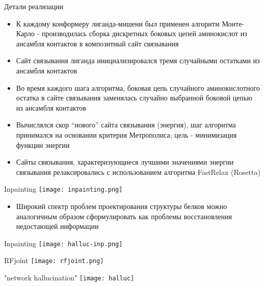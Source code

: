 \begin{frame}{Детали реализации}
    \begin{itemize}
        \item К каждому конформеру лиганда-мишени был применен алгоритм Монте-Карло - производилась
        сборка дискретных боковых цепей аминокислот из ансамбля контактов в композитный сайт
        связывания
        \item       
        Сайт связывания лиганда инициализировался тремя случайными остатками из ансамбля
        контактов
        \item
        Во время каждого шага алгоритма, боковая цепь случайного аминокислотного остатка в сайте
        связывания заменялась случайно выбранной боковой цепью из ансамбля контактов
        \item
        Вычислялся скор “нового” сайта связывания (энергия), шаг алгоритма принимался на основании
        критерия Метрополиса; цель - минимизация функции энергии
        \item
        Сайты связывания, характеризующиеся лучшими значениями энергии связывания
        релаксировались с использованием алгоритма FastRelax (Rosetta)
    \end{itemize}
   
\end{frame}

\begin{frame}{Inpainting}
    \centering
    \texttt{[image: inpainting.png]}
    \begin{itemize}
        \item Широкий спектр проблем проектирования структуры белков можно аналогичным образом сформулировать как проблемы восстановления недостающей информации 
        \end{itemize}

\end{frame}


\begin{frame}{Inpainting}
    \centering
    \texttt{[image: halluc-inp.png]}

\end{frame}

\begin{frame}{RFjoint}
    \centering
    \texttt{[image: rfjoint.png]}
\end{frame}

\begin{frame}{"network hallucination"}
    \centering
    \texttt{[image: halluc]}
\end{frame}

